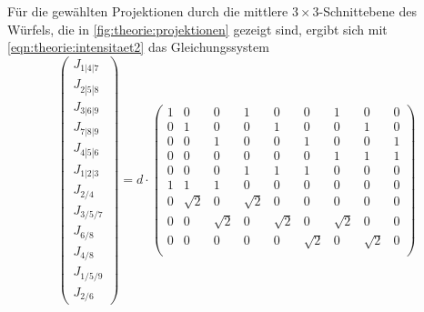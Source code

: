     Für die gewählten Projektionen durch die mittlere $3\times3$-Schnittebene des Würfels,
    die in \autoref{fig:theorie:projektionen} gezeigt sind,
    ergibt sich mit \autoref{eqn:theorie:intensitaet2} das Gleichungssystem
    \begin{equation}
        \label{eqn:theorie:intensitaet3}
        \begin{pmatrix}
            J_{1|4|7} \\
            J_{2|5|8} \\
            J_{3|6|9} \\
            J_{7|8|9} \\
            J_{4|5|6} \\
            J_{1|2|3} \\
            J_{2/4}  \\
            J_{3/5/7} \\
            J_{6/8}  \\
            J_{4/8}  \\
            J_{1/5/9} \\
            J_{2/6}
        \end{pmatrix}
        = d \cdot
        \begin{pmatrix}
            1        & 0        & 0        & 1        & 0        & 0        & 1        & 0        & 0        \\
            0        & 1        & 0        & 0        & 1        & 0        & 0        & 1        & 0        \\
            0        & 0        & 1        & 0        & 0        & 1        & 0        & 0        & 1        \\
            0        & 0        & 0        & 0        & 0        & 0        & 1        & 1        & 1        \\
            0        & 0        & 0        & 1        & 1        & 1        & 0        & 0        & 0        \\
            1        & 1        & 1        & 0        & 0        & 0        & 0        & 0        & 0        \\
            0        & \sqrt{2} & 0        & \sqrt{2} & 0        & 0        & 0        & 0        & 0        \\
            0        & 0        & \sqrt{2} & 0        & \sqrt{2} & 0        & \sqrt{2} & 0        & 0        \\
            0        & 0        & 0        & 0        & 0        & \sqrt{2} & 0        & \sqrt{2} & 0        \\

\end{pmatrix}
\end{equation}
